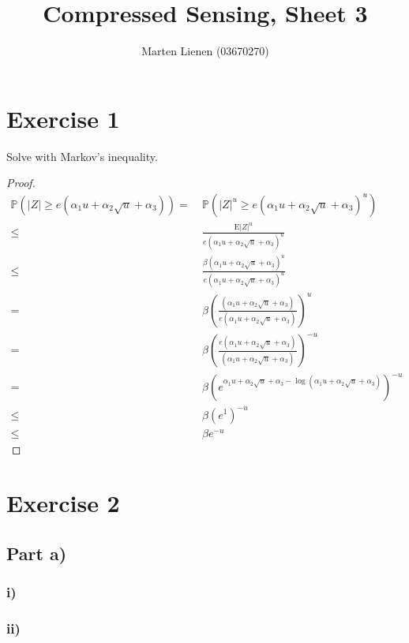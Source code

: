 \documentclass[10pt,a4paper]{article}
\title{Compressed Sensing, Sheet 3}
\author{Marten Lienen (03670270)}
\newcommand{\pr}[1]{\mathbb{P}\left( #1 \right)}
\begin{document}
\maketitle

\section*{Exercise 1}

Solve with Markov's inequality.

\begin{proof}
  \begin{align*}
    \pr{|Z| \ge e(\alpha_{1}u + \alpha_{2}\sqrt{u} + \alpha_{3})} =~& \pr{|Z|^{u} \ge e(\alpha_{1}u + \alpha_{2}\sqrt{u} + \alpha_{3})^{u}}\\
    \le~& \frac{\mathrm{E}|Z|^{u}}{e(\alpha_{1}u + \alpha_{2}\sqrt{u} + \alpha_{3})^{u}}\\
    \le~& \frac{\beta (\alpha_{1}u + \alpha_{2}\sqrt{u} + \alpha_{3})^{u}}{e(\alpha_{1}u + \alpha_{2}\sqrt{u} + \alpha_{3})^{u}}\\
    =~& \beta \left( \frac{(\alpha_{1}u + \alpha_{2}\sqrt{u} + \alpha_{3})}{e(\alpha_{1}u + \alpha_{2}\sqrt{u} + \alpha_{3})} \right)^{u}\\
    =~& \beta \left( \frac{e(\alpha_{1}u + \alpha_{2}\sqrt{u} + \alpha_{3})}{(\alpha_{1}u + \alpha_{2}\sqrt{u} + \alpha_{3})} \right)^{-u}\\
    =~& \beta \left( e^{\alpha_{1}u + \alpha_{2}\sqrt{u} + \alpha_{3} - \log(\alpha_{1}u + \alpha_{2}\sqrt{u} + \alpha_{3})} \right)^{-u}\\
    \le~& \beta \left( e^{1} \right)^{-u}\\
    \le~& \beta e^{-u}
  \end{align*}
\end{proof}

\section*{Exercise 2}

\subsection*{Part a)}

\subsubsection*{i)}

\subsubsection*{ii)}
\end{document}
